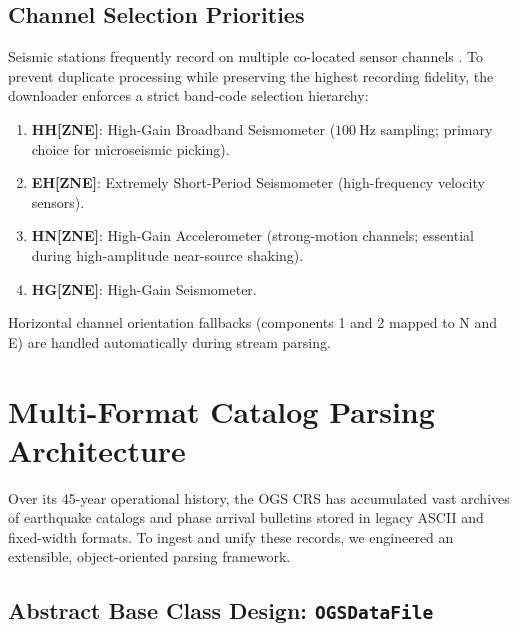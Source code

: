 \subsection{Channel Selection Priorities}
\label{subsec:channel_priorities}

Seismic stations frequently record on multiple co-located sensor
channels . To prevent
duplicate processing while preserving the highest recording fidelity, the
downloader enforces a strict band-code selection hierarchy:
\begin{enumerate}
  \item \textbf{HH[ZNE]}: High-Gain Broadband Seismometer
    ($\qty{100}{\hertz}$ sampling; primary choice for microseismic picking).
  \item \textbf{EH[ZNE]}: Extremely Short-Period Seismometer
    (high-frequency velocity sensors).
  \item \textbf{HN[ZNE]}: High-Gain Accelerometer (strong-motion
    channels; essential during high-amplitude near-source shaking).
  \item \textbf{HG[ZNE]}: High-Gain Seismometer.
\end{enumerate}
Horizontal channel orientation fallbacks (components 1 and 2 mapped
to N and E) are handled automatically during stream parsing.

\section{Multi-Format Catalog Parsing Architecture}
\label{sec:catalog_parsing}

Over its 45-year operational history, the \ac{OGS} \acf{CRS} has
accumulated vast archives of earthquake catalogs and
phase arrival bulletins stored in legacy ASCII and fixed-width
formats. To ingest and unify these records, we engineered an
extensible, object-oriented parsing framework.

\subsection{Abstract Base Class Design: \texttt{OGSDataFile}}
\label{subsec:ogsdatafile}

